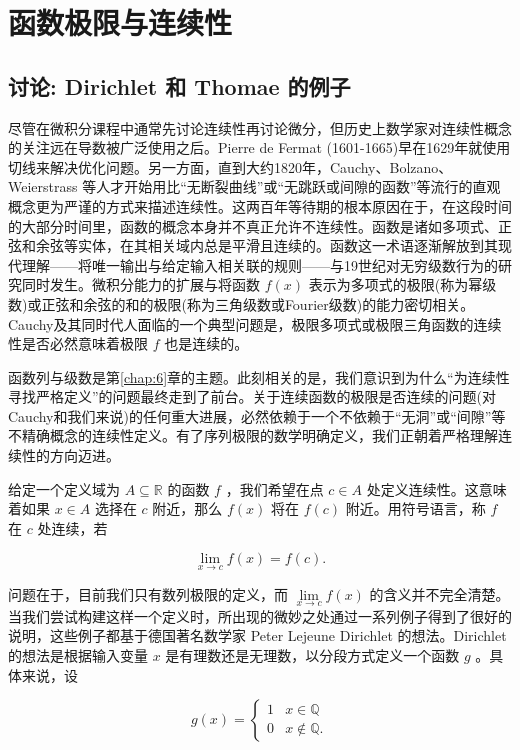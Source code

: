 \chapter{函数极限与连续性}
\label{chap:4}
\section{讨论: Dirichlet 和 Thomae 的例子}
\label{sec:4.1}

尽管在微积分课程中通常先讨论连续性再讨论微分，但历史上数学家对连续性概念的关注远在导数被广泛使用之后。Pierre de Fermat (1601-1665)早在1629年就使用切线来解决优化问题。另一方面，直到大约1820年，Cauchy、Bolzano、Weierstrass 等人才开始用比“无断裂曲线”或“无跳跃或间隙的函数”等流行的直观概念更为严谨的方式来描述连续性。这两百年等待期的根本原因在于，在这段时间的大部分时间里，函数的概念本身并不真正允许不连续性。函数是诸如多项式、正弦和余弦等实体，在其相关域内总是平滑且连续的。函数这一术语逐渐解放到其现代理解——将唯一输出与给定输入相关联的规则——与19世纪对无穷级数行为的研究同时发生。微积分能力的扩展与将函数 \(f\left( x\right)\) 表示为多项式的极限(称为幂级数)或正弦和余弦的和的极限(称为三角级数或Fourier级数)的能力密切相关。Cauchy及其同时代人面临的一个典型问题是，极限多项式或极限三角函数的连续性是否必然意味着极限 \(f\) 也是连续的。

函数列与级数是第\ref{chap:6}章的主题。此刻相关的是，我们意识到为什么“为连续性寻找严格定义”的问题最终走到了前台。关于连续函数的极限是否连续的问题(对Cauchy和我们来说)的任何重大进展，必然依赖于一个不依赖于“无洞”或“间隙”等不精确概念的连续性定义。有了序列极限的数学明确定义，我们正朝着严格理解连续性的方向迈进。

给定一个定义域为 \(A \subseteq  \mathbb{R}\) 的函数 \(f\) ，我们希望在点 \(c \in  A\) 处定义连续性。这意味着如果 \(x \in  A\) 选择在 \(c\) 附近，那么 \(f\left( x\right)\) 将在 \(f\left( c\right)\) 附近。用符号语言，称 \(f\) 在 \(c\) 处连续，若

\[
\mathop{\lim }\limits_{{x \rightarrow  c}}f\left( x\right)  = f\left( c\right) .
\]

问题在于，目前我们只有数列极限的定义，而 \(\mathop{\lim }\limits_{{x \rightarrow  c}}f\left( x\right)\) 的含义并不完全清楚。当我们尝试构建这样一个定义时，所出现的微妙之处通过一系列例子得到了很好的说明，这些例子都基于德国著名数学家 Peter Lejeune Dirichlet 的想法。Dirichlet的想法是根据输入变量 \(x\) 是有理数还是无理数，以分段方式定义一个函数 \(g\) 。具体来说，设

\[
g\left( x\right)  = \left\{  \begin{array}{ll} 1 & x \in  \mathbb{Q} \\  0 & x \notin  \mathbb{Q}. \end{array}\right.
\]

